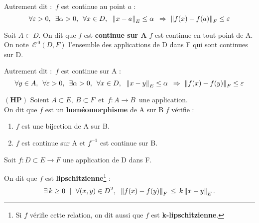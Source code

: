\vspace{0.1cm}

Autrement dit : \(\,f\) est continue au point $a$ \ssi :\vspace{-0.25cm}
\[\forall \varepsilon >0,\ \, \exists \alpha >0,\ \, \forall x\in D,\ \; \left\lVert x-a\right\rVert_E \leq \alpha \ \, \Rightarrow \ \left\lVert f(x)-f(a)\right\rVert_F\leq \varepsilon\]

\vspace{0.6cm}

\noindent Soit $A\subset D$. On dit que $f$ est \textbf{continue sur A} \ssi $f$ est continue en tout point de A. On note \(\,\mathscr{C}^{\,0}(D,F)\) l'ensemble des applications de D dans F qui sont continues sur D.

\vspace{0.2cm}

Autrement dit : \(\,f\) est continue sur A \ssi :\vspace{-0.25cm}
\[\forall y\in A,\ \,\forall \varepsilon >0,\ \, \exists \alpha >0,\ \, \forall x\in D,\ \; \norm{x-y}_E \leq \alpha \ \, \Rightarrow \ \norm{f(x)-f(y)}_F\leq \varepsilon\]

\vspace{1.7cm}

\(\left(\mathbf{HP}\right)\) Soient \(A\subset E,\ B\subset F\,\text{ et }\, f:A\to B\,\) une application.\vspace{0.1cm}\\
On dit que $f$ est un \textbf{homéomorphisme} de A sur B \ssi $f$ vérifie :
\begin{enumerate}[leftmargin=2cm,label=(\arabic*).]
    \item $f$ est une bijection de A sur B.
    \item $f$ est continue sur A et $f^{-1}$ est continue sur B.
\end{enumerate}

\vspace{1.7cm}

\noindent Soit \(f:D\subset E\to F\) une application de D dans F.

\vspace{0.3cm}

On dit que $f$ est \textbf{lipschitzienne}\footnote{Si $f$ vérifie cette relation, on dit aussi que $f$ est \textbf{k-lipschitzienne}.} \ssi :\vspace{-0.25cm} \[\exists\, k \geq 0 \ \mid \ \forall(x,y)\in D^2,\ \; \norm{f(x)-f(y)}_F\,\leq\, k\norm{x-y}_E.\vspace{0.1cm}\]

